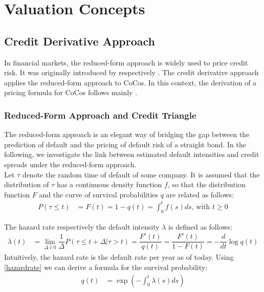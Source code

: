 \chapter{Valuation Concepts}

\section{Credit Derivative Approach} \label{sec:creditderivativeapproach}

In financial markets, the reduced-form approach is widely used to price credit risk. It was originally introduced by \citet{jarrow1995pricing} respectively \citet{duffie1999modeling}. The credit derivative approach applies the reduced-form approach to CoCos. In this context, the derivation of a pricing formula for CoCos follows mainly \citet{de2011pricing}. 

\subsection{Reduced-Form Approach and Credit Triangle}

The reduced-form approach is an elegant way of bridging the gap between the prediction of default and the pricing of default risk of a straight bond. In the following, we investigate the link between estimated default intensities and credit spreads under the reduced-form approach. \citep{lando2009credit}\\

Let $\tau$ denote the random time of default of some company. It is assumed that the distribution of $\tau$ has a continuous density function $f$, so that the distribution function $F$ and the curve of survival probabilities $q$ are related as follows:  
\begin{align}
P(\tau \leq t) &= F(t) = 1 - q(t) = \int_0^t f(s) ds \text{, with } t \geq 0
\end{align}

The hazard rate respectively the default intensity $\lambda$ is defined as follows:
\begin{align} \label{hazardrate}
\lambda(t) &= \lim_{\Delta \downarrow 0} \dfrac{1}{\Delta} P(\tau \leq t + \Delta | \tau > t) = \dfrac{F'(t)}{q(t)} = \dfrac{F'(t)}{1 - F(t)} = - \dfrac{d}{dt} \log q(t)
\end{align}
Intuitively, the hazard rate is the default rate per year as of today. Using \ref{hazardrate} we can derive a formula for the survival probability:
\begin{align}
q(t) &= \exp \left(- \int_0^t \lambda (s) ds \right)
\end{align}

